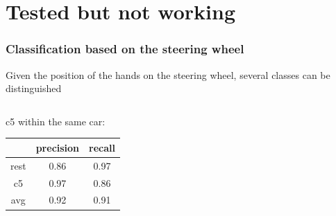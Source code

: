 \documentclass{beamer}
\begin{document}
	
	\section{Tested but not working}	
    
    \begin{frame}
    	\frametitle{Classification based on the steering wheel}
    	Given the position of the hands on the steering wheel, several classes can be distinguished
    	\begin{columns}
    		\begin{column}{0.5\textwidth}
    			\centering
				c5 within the same car:
    			\begin{tabular}{c|cc}
    				& precision & recall \\ 
    				\hline rest & 0.86 & 0.97 \\ 
		    		c5 & 0.97 & 0.86 \\ 
    				\hline avg & 0.92 & 0.91 \\  
    			\end{tabular} 
    			

\end{column}
\end{columns}
\end{frame}
\end{document}
